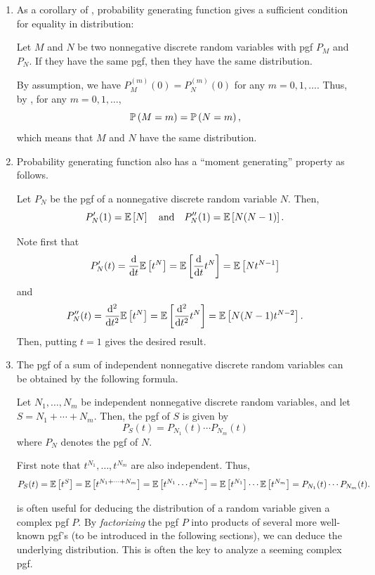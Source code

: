 \begin{enumerate}
\item As a corollary of , probability generating
function gives a sufficient condition for equality in distribution:
\begin{corollary}
\label{cor:pgf-equal-dist}
Let \(M\) and \(N\) be two nonnegative discrete random variables with pgf
\(P_M\) and \(P_N\). If they have the same pgf, then they have the same
distribution.
\end{corollary}
\begin{pf}
By assumption, we have \(P_M^{(m)}(0)=P_N^{(m)}(0)\) for any \(m=0,1,\dotsc\).
Thus, by , for any \(m=0,1,\dotsc\),
\[
\mathbb{P}\left(M=m\right)=\mathbb{P}\left(N=m\right),
\]
which means that \(M\) and \(N\) have the same distribution.
\end{pf}

\item Probability generating function also has a ``moment generating'' property
as follows.
\begin{proposition}
\label{prp:pgf-gen-mom}
Let \(P_N\) be the pgf of a nonnegative discrete random variable \(N\).  Then,
\[
P_N'(1)=\expv{N}\qqtext{and}P_N''(1)=\expv{N(N-1)}.
\]
\end{proposition}
\begin{pf}
Note first that
\[
P_N'(t)=\dv{}{t}\mathbb{E}\left[t^{N}\right]=\mathbb{E}\left[\dv{}{t}t^{N}\right]=\mathbb{E}\left[Nt^{N-1}\right]
\]
and
\[
P_N''(t)=\dv[2]{}{t}\mathbb{E}\left[t^{N}\right]=\mathbb{E}\left[\dv[2]{}{t}t^{N}\right]=\mathbb{E}\left[N(N-1)t^{N-2}\right].
\]
Then, putting \(t=1\) gives the desired result.
\end{pf}
\item The pgf of a sum of independent nonnegative discrete random variables can
be obtained by the following formula.
\begin{theorem}
\label{thm:pgf-sum}
Let \(N_1,\dotsc,N_m\) be independent nonnegative discrete random variables,
and let \(S=N_1+\dotsb+N_m\). Then, the pgf of \(S\) is given by
\[
P_S(t)=P_{N_1}(t)\dotsb P_{N_m}(t)
\]
where \(P_N\) denotes the pgf of \(N\).
\end{theorem}
\begin{pf}
First note that \(t^{N_1},\dotsc,t^{N_m}\) are also independent. Thus,
\[
P_S(t)=\mathbb{E}\left[t^S\right]=\mathbb{E}\left[t^{N_1+\dotsb+N_m}\right]
=\mathbb{E}\left[t^{N_1}\dotsb t^{N_m}\right]
=\mathbb{E}\left[t^{N_1}\right]\dotsb\mathbb{E}\left[t^{N_m}\right]
=P_{N_1}(t)\dotsb P_{N_m}(t).
\]
\end{pf}

 is often useful for deducing the distribution of a random
variable given a complex pgf \(P\). By \emph{factorizing} the pgf \(P\) into
products of several more well-known pgf's (to be introduced in the following
sections), we can deduce the underlying distribution. This is often the key
 to analyze a seeming complex pgf.


\end{enumerate}
